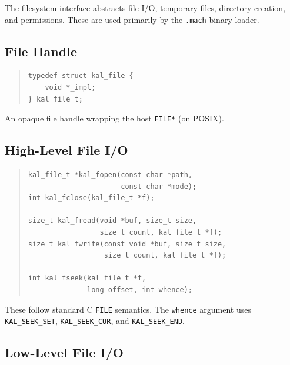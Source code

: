 \documentclass[11pt,twoside]{article}
\begin{document}
The filesystem interface abstracts file I/O, temporary files,
directory creation, and permissions.  These are used primarily by
the {\tt .mach} binary loader.

\subsection{File Handle}

\begin{quote}
\begin{verbatim}
typedef struct kal_file {
    void *_impl;
} kal_file_t;
\end{verbatim}
\end{quote}

An opaque file handle wrapping the host {\tt FILE*} (on POSIX).

\subsection{High-Level File I/O}

\begin{quote}
\begin{verbatim}
kal_file_t *kal_fopen(const char *path,
                      const char *mode);
int kal_fclose(kal_file_t *f);

size_t kal_fread(void *buf, size_t size,
                 size_t count, kal_file_t *f);
size_t kal_fwrite(const void *buf, size_t size,
                  size_t count, kal_file_t *f);

int kal_fseek(kal_file_t *f,
              long offset, int whence);
\end{verbatim}
\end{quote}

These follow standard C {\tt FILE} semantics.  The {\tt whence}
argument uses {\tt KAL\_SEEK\_SET}, {\tt KAL\_SEEK\_CUR}, and
{\tt KAL\_SEEK\_END}.

\subsection{Low-Level File I/O}
\end{document}
